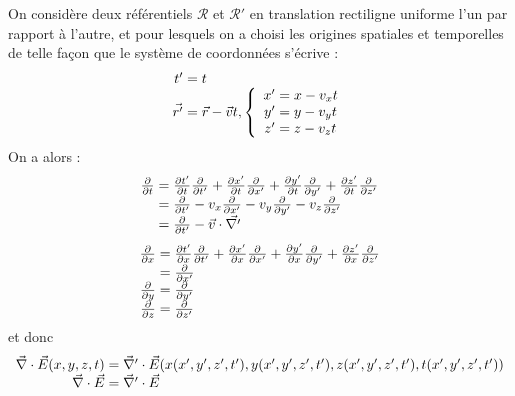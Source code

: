 On considère deux référentiels $\mathcal{R}$ et $\mathcal{R}'$ en translation rectiligne uniforme l'un par rapport à l'autre, et pour lesquels on a choisi les origines spatiales et temporelles de telle façon que le système de coordonnées s'écrive :
$$
	\begin{array}{r@{\;}l}
		t'&=t\\
		\vec{r'}&=\vec{r}-\vec{v}t, \left\{ \begin{array}{r@{\;}l}
				x'&=x-v_{x}t \\
				y'&=y-v_{y}t \\
				z'&=z-v_{z}t \\
			\end{array} \right.
	\end{array}
$$
On a alors :
{\renewcommand*{\arraystretch}{2}
$$
	\begin{array}{r@{\;}l}
		\frac{\partial}{\partial t}&=\frac{\partial t'}{\partial t} \frac{\partial}{\partial t'}
				+\frac{\partial x'}{\partial t} \frac{\partial}{\partial x'}
				+\frac{\partial y'}{\partial t} \frac{\partial}{\partial y'}
				+\frac{\partial z'}{\partial t} \frac{\partial}{\partial z'}\\
		&=\frac{\partial}{\partial t'} - v_{x} \frac{\partial}{\partial x'}
				- v_{y} \frac{\partial}{\partial y'}
				- v_{z} \frac{\partial}{\partial z'}\\
		&=\frac{\partial}{\partial t'} - \vec{v}\cdot \vec{\nabla '}
	\end{array}
$$		
$$
	\begin{array}{r@{\;}l}
		\frac{\partial}{\partial x}&=\frac{\partial t'}{\partial x} \frac{\partial}{\partial t'}
				+\frac{\partial x'}{\partial x} \frac{\partial}{\partial x'}
				+\frac{\partial y'}{\partial x} \frac{\partial}{\partial y'}
				+\frac{\partial z'}{\partial x} \frac{\partial}{\partial z'}\\
		&=\frac{\partial}{\partial x'}\\
		\frac{\partial}{\partial y}&=\frac{\partial}{\partial y'}\\
		\frac{\partial}{\partial z}&=\frac{\partial}{\partial z'}
	\end{array}
$$}
et donc 
$$
	\begin{array}{r@{\;}l}
		\nab\cdot\vec{E}(x,y,z,t)&=\nab'\cdot\vec{E}(x(x',y',z',t'),y(x',y',z',t'),z(x',y',z',t'),t(x',y',z',t'))\\ 
		\nab\cdot\vec{E}&=\nab'\cdot\vec{E}
	\end{array}
$$

